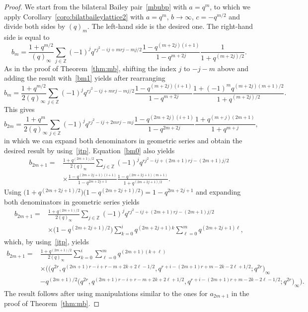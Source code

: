 \documentclass[pdftex]{sigma}
\numberwithin{equation}{section}
\begin{document}
\begin{proof}
We start from the bilateral Bailey pair~\eqref{mbubp} with $a=q^m$, to which we apply Corollary~\ref{coro:bilatbaileylattice2} with $a=q^m$, $b\to\infty$, $c=-q^{m/2}$ and divide both sides by $(q)_m$. The left-hand side is the desired one. The right-hand side is equal to
\begin{equation}\label{bm1}
b_m=\frac{1+q^{m/2}}{(q)_\infty}\sum_{j\in\mathbb{Z}}(-1)^jq^{rj^2-ij+mrj-mj/2}\frac{1-q^{(m+2j)(i+1)}}{1-q^{m+2j}}\frac{1}{1+q^{(m+2j)/2}}.
\end{equation}
As in the proof of Theorem~\ref{thm:mb}, shifting the index $j$ to $-j-m$ above and adding the result with~\eqref{bm1} yields after rearranging
\begin{equation}\label{bm0}
b_{m}=\frac{1+q^{m/2}}{2(q)_\infty}\sum_{j\in\mathbb{Z}}(-1)^jq^{rj^2-ij+mrj-mj/2}\frac{1-q^{(m+2j)(i+1)}}{1-q^{m+2j}}\frac{1+(-1)^mq^{(m+2j)(m+1)/2}}{1+q^{(m+2j)/2}}.
\end{equation}
This gives
\begin{equation*}
b_{2m}=\frac{1+q^m}{2(q)_\infty}\sum_{j\in\mathbb{Z}}(-1)^jq^{rj^2-ij+2mrj-mj}\frac{1-q^{(2m+2j)(i+1)}}{1-q^{2m+2j}}\frac{1+q^{(m+j)(2m+1)}}{1+q^{m+j}},
\end{equation*}
in which we can expand both denominators in geometric series and obtain the desired result by using~\eqref{jtp}. Equation~\eqref{bm0} also yields
\begin{align*}
b_{2m+1}={}&\frac{1+q^{(2m+1)/2}}{2(q)_\infty}\sum_{j\in\mathbb{Z}}(-1)^jq^{rj^2-ij+(2m+1)rj-(2m+1)j/2}\\
&\times\frac{1-q^{(2m+2j+1)(i+1)}}{1-q^{2m+2j+1}}\frac{1-q^{(2m+2j+1)(m+1)}}{1+q^{(2m+2j+1)/2}}.
\end{align*}
Using $\bigl(1+q^{(2m+2j+1)/2}\bigr)\bigl(1-q^{(2m+2j+1)/2}\bigr)=1-q^{2m+2j+1}$ and expanding both denominators in geometric series yields
\begin{align*}
b_{2m+1}={}&\frac{1+q^{(2m+1)/2}}{2(q)_\infty}\sum_{j\in\mathbb{Z}}(-1)^jq^{rj^2-ij+(2m+1)rj-(2m+1)j/2}\\
&\times\bigl(1-q^{(2m+2j+1)/2}\bigr)\sum_{k=0}^iq^{(2m+2j+1)k}\sum_{\ell=0}^mq^{(2m+2j+1)\ell},
\end{align*}
which, by using~\eqref{jtp}, yields
\begin{align*}
b_{2m+1}={}&\frac{1+q^{(2m+1)/2}}{2(q)_\infty}\sum_{k=0}^i\sum_{\ell=0}^mq^{(2m+1)(k+\ell)}\\
&\times\bigl(\bigl(q^{2r},q^{(2m+1)r-i+r-m+2k+2\ell-1/2},q^{r+i-(2m+1)r+m-2k-2\ell+1/2};q^{2r}\bigr)_\infty \\
 &- q^{(2m+1)/2}\bigl(q^{2r},q^{(2m+1)r-i+r-m+2k+2\ell+1/2},q^{r+i-(2m+1)r+m-2k-2\ell-1/2};q^{2r}\bigr)_\infty\bigr).
\end{align*}
The result follows after using manipulations similar to the ones for $a_{2m+1}$ in the proof of Theorem~\ref{thm:mb}.
\end{proof}
\end{document}

